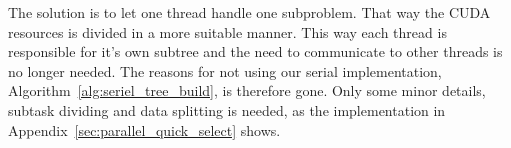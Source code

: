The solution is to let one thread handle one subproblem. That way the CUDA resources is divided in a more suitable manner. This way each thread is responsible for it's own subtree and the need to communicate to other threads is no longer needed. The reasons for not using our serial implementation, Algorithm~\ref{alg:seriel_tree_build}, is therefore gone. Only some minor details, subtask dividing and data splitting is needed, as the implementation in Appendix~\ref{sec:parallel_quick_select} shows.








%





